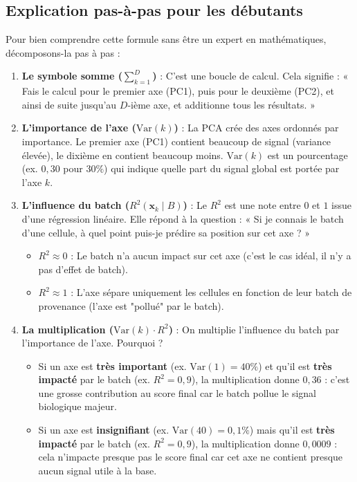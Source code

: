 \documentclass[11pt,a4paper]{article}
\begin{document}
\subsection{Explication pas-à-pas pour les débutants}

Pour bien comprendre cette formule sans être un expert en mathématiques, décomposons-la pas à pas :

\begin{enumerate}
    \item \textbf{Le symbole somme ($\sum_{k=1}^{D}$)} :
    C'est une boucle de calcul. Cela signifie : « Fais le calcul pour le premier axe (PC1), puis pour le deuxième (PC2), et ainsi de suite jusqu'au $D$-ième axe, et additionne tous les résultats. »
    
    \item \textbf{L'importance de l'axe ($\text{Var}(k)$)} :
    La PCA crée des axes ordonnés par importance. Le premier axe (PC1) contient beaucoup de signal (variance élevée), le dixième en contient beaucoup moins. $\text{Var}(k)$ est un pourcentage (ex. $0{,}30$ pour $30\%$) qui indique quelle part du signal global est portée par l'axe $k$.
    
    \item \textbf{L'influence du batch ($R^2(\mathbf{x}_k \mid B)$)} :
    Le $R^2$ est une note entre $0$ et $1$ issue d'une régression linéaire. Elle répond à la question : « Si je connais le batch d'une cellule, à quel point puis-je prédire sa position sur cet axe ? »
    \begin{itemize}
        \item $R^2 \approx 0$ : Le batch n'a aucun impact sur cet axe (c'est le cas idéal, il n'y a pas d'effet de batch).
        \item $R^2 \approx 1$ : L'axe sépare uniquement les cellules en fonction de leur batch de provenance (l'axe est "pollué" par le batch).
    \end{itemize}
    
    \item \textbf{La multiplication ($\text{Var}(k) \cdot R^2$)} :
    On multiplie l'influence du batch par l'importance de l'axe. Pourquoi ?
    \begin{itemize}
        \item Si un axe est \textbf{très important} (ex. $\text{Var}(1) = 40\%$) et qu'il est \textbf{très impacté} par le batch (ex. $R^2 = 0{,}9$), la multiplication donne $0{,}36$ : c'est une grosse contribution au score final car le batch pollue le signal biologique majeur.
        \item Si un axe est \textbf{insignifiant} (ex. $\text{Var}(40) = 0{,}1\%$) mais qu'il est \textbf{très impacté} par le batch (ex. $R^2 = 0{,}9$), la multiplication donne $0{,}0009$ : cela n'impacte presque pas le score final car cet axe ne contient presque aucun signal utile à la base.
    \end{itemize}
    

\end{enumerate}
\end{document}
